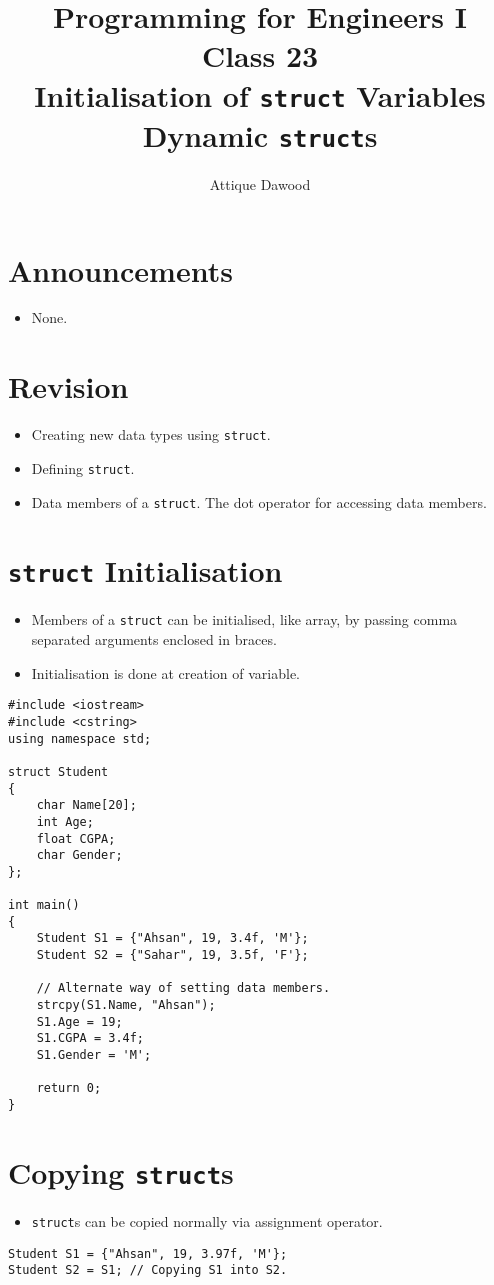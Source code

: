 \documentclass[12pt,a4paper]{article}
\title{\vspace{-2cm}Programming for Engineers I\\Class 23\\Initialisation of \texttt{struct} Variables\\Dynamic \texttt{struct}s}
\author{Attique Dawood}
\begin{document}
\maketitle
\section{Announcements}
\begin{itemize}
\item None.
\end{itemize}
\section{Revision}
\begin{itemize}
\item Creating new data types using \verb|struct|.
\item Defining \verb|struct|.
\item Data members of a \verb|struct|. The dot operator for accessing data members.
\end{itemize}
\section{\texttt{struct} Initialisation}
\begin{itemize}
\item Members of a \verb|struct| can be initialised, like array, by passing comma separated arguments enclosed in braces.
\item Initialisation is done at creation of variable.
\end{itemize}
\begin{lstlisting}[caption={\texttt{struct} Initialisation}]
#include <iostream>
#include <cstring>
using namespace std;

struct Student
{
	char Name[20];
	int Age;
	float CGPA;
	char Gender;
};

int main()
{
	Student S1 = {"Ahsan", 19, 3.4f, 'M'};
	Student S2 = {"Sahar", 19, 3.5f, 'F'};

	// Alternate way of setting data members.
	strcpy(S1.Name, "Ahsan");
	S1.Age = 19;
	S1.CGPA = 3.4f;
	S1.Gender = 'M';

	return 0;
}
\end{lstlisting}
\section{Copying \texttt{struct}s}
\begin{itemize}
\item \texttt{struct}s can be copied normally via assignment operator.
\end{itemize}
\begin{lstlisting}
Student S1 = {"Ahsan", 19, 3.97f, 'M'};
Student S2 = S1; // Copying S1 into S2.
\end{lstlisting}
\end{document}
